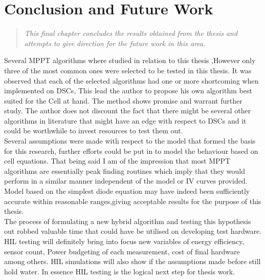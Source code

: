 \chapter{Conclusion and Future Work}
\begin{quote} 
\it This final chapter concludes the results obtained from the thesis and attempts to give direction for the future work in this area.
\end{quote}

Several \ac{MPPT} algorithms where studied in relation to this thesis ,However only three of the most common ones were selected to be tested in this thesis. It was observed that each of the selected algorithms had one or more shortcoming when implemented on \ac{DSCs}, This lead the author to propose his own algorithm best suited for the Cell at hand. The method shows promise and warrant further study. The author does not discount the fact that there might be several other algorithms in literature that might have an edge with respect to \ac{DSCs} and it could be worthwhile to invest resources to test them out.\\

Several assumptions were made with respect to the model that formed the basis for this research, further efforts could be put in to model the behaviour based on cell equations. That being said I am of the impression that most \ac{MPPT} algorithms are essentially peak finding routines which imply that they would perform in a similar manner independent of the model or IV curves provided. Model based on the simplest diode equation may have indeed been sufficiently accurate within reasonable ranges,giving acceptable results for the purpose of this thesis.\\

The process of formulating a new hybrid algorithm and testing this hypothesis out robbed valuable time that could have be utilised on developing test hardware. \ac{HIL} testing will definitely bring into focus new variables of energy efficiency, sensor count, Power budgeting of each measurement, cost of final hardware among others. \ac{HIL} simulations will also show if the assumptions made before still hold water. In essence \ac{HIL} testing is the logical next step for thesis work.\\